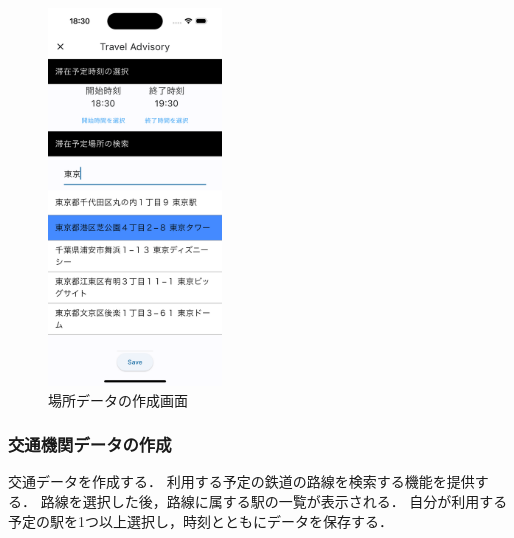 \begin{figure}[H]
  \centering
  \includegraphics[height=10cm]{./fig/spot_data_save.png}
  \caption{場所データの作成画面}
  \label{fig:spot_data_save}
\end{figure}

\subsubsection {交通機関データの作成}
交通データを作成する．
利用する予定の鉄道の路線を検索する機能を提供する．
路線を選択した後，路線に属する駅の一覧が表示される．
自分が利用する予定の駅を1つ以上選択し，時刻とともにデータを保存する．

